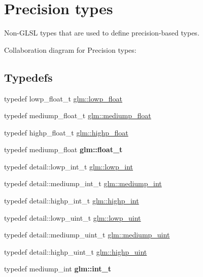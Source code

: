 \hypertarget{group__core__precision}{}\section{Precision types}
\label{group__core__precision}


Non-\/\+G\+L\+S\+L types that are used to define precision-\/based types.  


Collaboration diagram for Precision types\+:
\subsection*{Typedefs}
\begin{DoxyCompactItemize}
\item 
typedef lowp\+\_\+float\+\_\+t \hyperlink{group__core__precision_ga2887fbc729ac5c1c5caeb7cd57a7145c}{glm\+::lowp\+\_\+float}
\item 
typedef mediump\+\_\+float\+\_\+t \hyperlink{group__core__precision_gac785826c039fe6c97c03b37c81c1a68e}{glm\+::mediump\+\_\+float}
\item 
typedef highp\+\_\+float\+\_\+t \hyperlink{group__core__precision_ga3d443a093adc053638ed7f81c5bfe300}{glm\+::highp\+\_\+float}
\item 
\hypertarget{group__core__precision_gae01b87f81bd15327230bf1b47c482b24}{}typedef mediump\+\_\+float {\bfseries glm\+::float\+\_\+t}\label{group__core__precision_gae01b87f81bd15327230bf1b47c482b24}

\item 
typedef detail\+::lowp\+\_\+int\+\_\+t \hyperlink{group__core__precision_ga4681244bf4a184734f03aa9df4e3d288}{glm\+::lowp\+\_\+int}
\item 
typedef detail\+::mediump\+\_\+int\+\_\+t \hyperlink{group__core__precision_ga2a3dcbcd7f4e17663d393a12061ac6ac}{glm\+::mediump\+\_\+int}
\item 
typedef detail\+::highp\+\_\+int\+\_\+t \hyperlink{group__core__precision_gaafed5240eb0a43328cb75faf5fb0a8c2}{glm\+::highp\+\_\+int}
\item 
typedef detail\+::lowp\+\_\+uint\+\_\+t \hyperlink{group__core__precision_ga8077c90f2c87e419ea6c273157dcc1fc}{glm\+::lowp\+\_\+uint}
\item 
typedef detail\+::mediump\+\_\+uint\+\_\+t \hyperlink{group__core__precision_ga08ae38ad78ade3539fdd1d25052b8c51}{glm\+::mediump\+\_\+uint}
\item 
typedef detail\+::highp\+\_\+uint\+\_\+t \hyperlink{group__core__precision_gabfd1cf11193324a5f77d3831b6ac3205}{glm\+::highp\+\_\+uint}
\item 
\hypertarget{group__core__precision_gacd01d170508f812968875b0f2e730e8c}{}typedef mediump\+\_\+int {\bfseries glm\+::int\+\_\+t}\label{group__core__precision_gacd01d170508f812968875b0f2e730e8c}


\end{DoxyCompactItemize}
